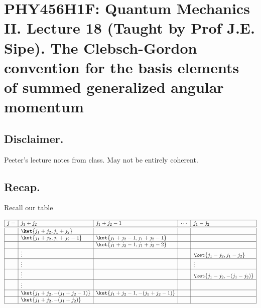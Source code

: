 
%

\chapter{PHY456H1F: Quantum Mechanics II.  Lecture 18 (Taught by Prof J.E. Sipe).  The Clebsch-Gordon convention for the basis elements of summed generalized angular momentum}
\label{chap:qmTwoL18}
{}
\date{Nov 12, 2011}

\beginArtWithToc

\section{Disclaimer.}

Peeter's lecture notes from class.  May not be entirely coherent.

\section{Recap.}

Recall our table

\begin{equation}\label{eqn:qmTwoL18:10}
\begin{array}{| l | l | l | l | l |}
\hline
j = & j_1 + j_2				& j_1 + j_2 -1 				& \cdots 	& j_1 - j_2 \\
\hline
\hline
  &  \ket{j_1 + j_2, j_1 + j_2}	 	&					& 		& \\
\hline
  &  \ket{j_1 + j_2, j_1 + j_2 - 1}	&  \ket{j_1 + j_2 - 1, j_1 + j_2 - 1}	& 		& \\
\hline
  &                                     & \ket{j_1 + j_2 - 1, j_1 + j_2 - 2}	& 		& \\
\hline
  & \vdots 	 			&					& 		& \ket{j_1 - j_2, j_1 - j_2} \\
\hline
  & \vdots 	 			&					& 		& \vdots \\
\hline
  & \vdots 	 			&					& 		& \ket{j_1 - j_2, -(j_1 - j_2)} \\
\hline
  & \vdots 	 			&					& 		& \\
\hline
  &  \ket{j_1 + j_2, -(j_1 + j_2 - 1)}	& \ket{j_1 + j_2 -1, -(j_1 + j_2 - 1)}	& 		& \\
\hline
  &  \ket{j_1 + j_2, -(j_1 + j_2)}	&					& 		&  \\
\hline
\end{array}
\end{equation}


